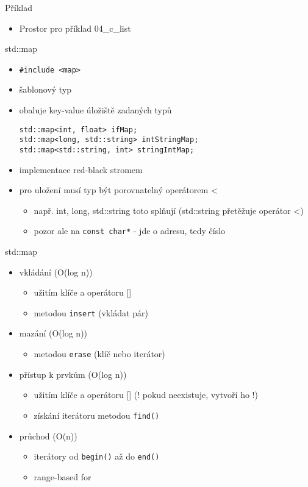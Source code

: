 \documentclass{beamer}
\begin{document}
\begin{xframe}{Příklad}
	\begin{itemize}
		\item Prostor pro příklad 04\_c\_list
	\end{itemize}
\end{xframe}


\begin{xframe}{std::map}
	\begin{itemize}
		\item \texttt{\#include <map>}
		\item šablonový typ
		\item obaluje key-value úložiště zadaných typů
\begin{lstlisting}[basicstyle=\fontsize{8}{9}\selectfont\ttfamily]
std::map<int, float> ifMap;
std::map<long, std::string> intStringMap;
std::map<std::string, int> stringIntMap;
\end{lstlisting}
		\item implementace red-black stromem
		\item pro uložení musí typ být porovnatelný operátorem <
			\begin{itemize}
				\item např. int, long, std::string toto splňují (std::string přetěžuje operátor <)
				\item pozor ale na \texttt{const char*} - jde o adresu, tedy číslo
			\end{itemize}
	\end{itemize}
\end{xframe}

\begin{xframe}{std::map}
	\begin{itemize}
		\item vkládání (O(log n))
			\begin{itemize}
				\item užitím klíče a operátoru []
				\item metodou \texttt{insert} (vkládat pár)
			\end{itemize}
		\item mazání (O(log n))
			\begin{itemize}
				\item metodou \texttt{erase} (klíč nebo iterátor)
			\end{itemize}
		\item přístup k prvkům (O(log n))
			\begin{itemize}
				\item užitím klíče a operátoru [] (! pokud neexistuje, vytvoří ho !)
				\item získání iterátoru metodou \texttt{find()}
			\end{itemize}
		\item průchod (O(n))
			\begin{itemize}
				\item iterátory od \texttt{begin()} až do \texttt{end()}
				\item range-based for
			\end{itemize}
	\end{itemize}
\end{xframe}
\end{document}
